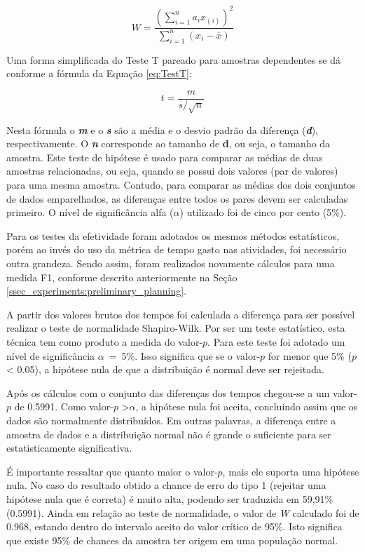 \begin{equation}
\label{eq:Shapiro}
W = \frac{\left(\sum_{i=1}^{n} a_ix_{(i)}\right)^2}{\sum_{i=1}^{n}\left(x_i -\overline{x}\right)} 
\end{equation}

Uma forma simplificada do Teste T pareado para amostras dependentes
se dá conforme a fórmula da Equação \ref{eq:TestT}:

\begin{equation}
\label{eq:TestT}
t = \frac{m}{s/\sqrt{n}} 
\end{equation}

Nesta fórmula o \textit{\textbf{m}} e o \textit{\textbf{s}} são a média e o desvio padrão da diferença (\textbf{\textit{d}}), respectivamente. 
O \textit{\textbf{n}} corresponde ao tamanho de \textbf{\textbf{d}}, ou seja, o tamanho da amostra.
Este teste de hipótese é usado para comparar as médias de duas amostras relacionadas, ou seja, quando se possui dois valores (par de valores) para uma mesma amostra. 
Contudo, para comparar as médias dos dois conjuntos de dados emparelhados, as diferenças entre todos os pares devem ser calculadas primeiro.
O nível de significância alfa ($\alpha$) utilizado foi de cinco por cento (5\%).

Para os testes da efetividade foram adotados os mesmos métodos estatísticos, porém ao invés do uso da métrica de tempo gasto nas atividades, foi necessário outra grandeza.
Sendo assim, foram realizados novamente cálculos para uma medida F1, conforme descrito anteriormente na Seção \ref{ssec_experiments:preliminary_planning}.


A partir dos valores brutos dos tempos foi calculada a diferença para ser possível realizar o teste de normalidade Shapiro-Wilk.
Por ser um teste estatístico, esta técnica tem como produto a medida do valor-$p$.
Para este teste foi adotado um nível de significância $\alpha$~=~5\%. 
Isso significa que se o valor-$p$ for menor que 5\% ($p$ < 0.05), a hipótese nula de que a distribuição é normal deve ser rejeitada.

Após os cálculos com o conjunto das diferenças dos tempos chegou-se a um valor-$p$ de 0.5991.
Como valor-$p$ \textgreater $\alpha$, a hipótese nula foi aceita, concluindo assim que os dados são normalmente distribuídos.
Em outras palavras, a diferença entre a amostra de dados e a distribuição normal não é grande o suficiente para ser estatisticamente significativa.

É importante ressaltar que quanto maior o valor-$p$, mais ele suporta uma hipótese nula. 
No caso do resultado obtido a chance de erro do tipo 1 (rejeitar uma hipótese nula que é correta) é muito alta, podendo ser traduzida em 59,91\% (0.5991).
Ainda em relação ao teste de normalidade, o valor de \textit{W} calculado foi de 0.968, estando dentro do intervalo aceito do valor crítico de 95\%. 
Isto significa que existe 95\% de chances da amostra ter origem em uma população normal.

